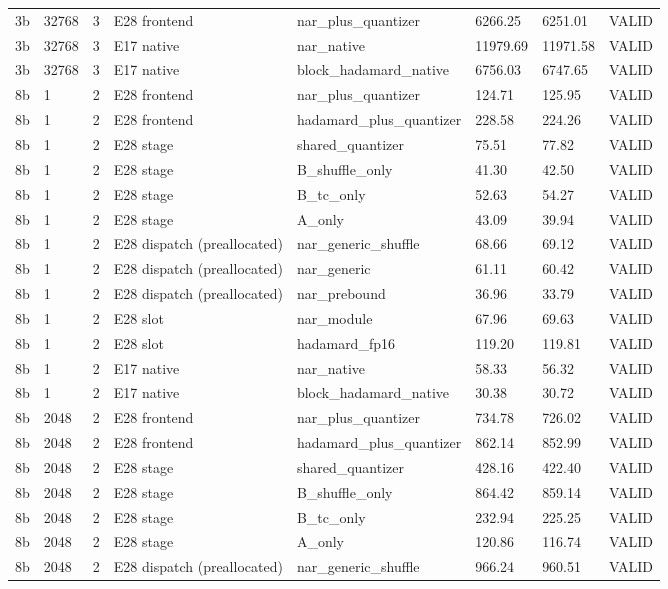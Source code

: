 {\begin{longtable}{llllllll}
3b & 32768 & 3 & E28 frontend & nar\_plus\_quantizer & 6266.25 & 6251.01 & VALID \\
3b & 32768 & 3 & E17 native & nar\_native & 11979.69 & 11971.58 & VALID \\
3b & 32768 & 3 & E17 native & block\_hadamard\_native & 6756.03 & 6747.65 & VALID \\
8b & 1 & 2 & E28 frontend & nar\_plus\_quantizer & 124.71 & 125.95 & VALID \\
8b & 1 & 2 & E28 frontend & hadamard\_plus\_quantizer & 228.58 & 224.26 & VALID \\
8b & 1 & 2 & E28 stage & shared\_quantizer & 75.51 & 77.82 & VALID \\
8b & 1 & 2 & E28 stage & B\_shuffle\_only & 41.30 & 42.50 & VALID \\
8b & 1 & 2 & E28 stage & B\_tc\_only & 52.63 & 54.27 & VALID \\
8b & 1 & 2 & E28 stage & A\_only & 43.09 & 39.94 & VALID \\
8b & 1 & 2 & E28 dispatch (preallocated) & nar\_generic\_shuffle & 68.66 & 69.12 & VALID \\
8b & 1 & 2 & E28 dispatch (preallocated) & nar\_generic & 61.11 & 60.42 & VALID \\
8b & 1 & 2 & E28 dispatch (preallocated) & nar\_prebound & 36.96 & 33.79 & VALID \\
8b & 1 & 2 & E28 slot & nar\_module & 67.96 & 69.63 & VALID \\
8b & 1 & 2 & E28 slot & hadamard\_fp16 & 119.20 & 119.81 & VALID \\
8b & 1 & 2 & E17 native & nar\_native & 58.33 & 56.32 & VALID \\
8b & 1 & 2 & E17 native & block\_hadamard\_native & 30.38 & 30.72 & VALID \\
8b & 2048 & 2 & E28 frontend & nar\_plus\_quantizer & 734.78 & 726.02 & VALID \\
8b & 2048 & 2 & E28 frontend & hadamard\_plus\_quantizer & 862.14 & 852.99 & VALID \\
8b & 2048 & 2 & E28 stage & shared\_quantizer & 428.16 & 422.40 & VALID \\
8b & 2048 & 2 & E28 stage & B\_shuffle\_only & 864.42 & 859.14 & VALID \\
8b & 2048 & 2 & E28 stage & B\_tc\_only & 232.94 & 225.25 & VALID \\
8b & 2048 & 2 & E28 stage & A\_only & 120.86 & 116.74 & VALID \\
8b & 2048 & 2 & E28 dispatch (preallocated) & nar\_generic\_shuffle & 966.24 & 960.51 & VALID \\

\end{longtable}}
